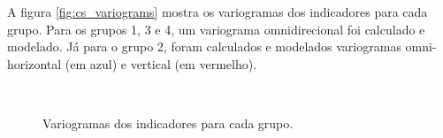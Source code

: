 A figura \autoref{fig:cs_variograms} mostra os variogramas dos indicadores para cada grupo. Para os grupos 1, 3 e 4, um variograma omnidirecional foi calculado e modelado. Já para o grupo 2, foram calculados e modelados variogramas omni-horizontal (em azul) e vertical (em vermelho).

\begin{figure}[H]
    \caption{Variogramas dos indicadores para cada grupo.} \label{fig:cs_variograms}
     \centering
     \hspace{1em}
     \\

\end{figure}
